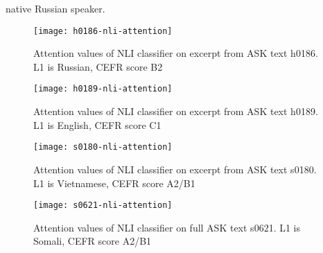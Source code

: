 native Russian speaker.  

\begin{figure}
  \centering
  \texttt{[image: h0186-nli-attention]}
  \caption{Attention values of NLI classifier on excerpt from ASK text h0186.
           L1 is Russian, CEFR score B2}
  \label{fig:h0186-nli-attention}
\end{figure}

\begin{figure}
  \centering
  \texttt{[image: h0189-nli-attention]}
  \caption{Attention values of NLI classifier on excerpt from ASK text h0189.
           L1 is English, CEFR score C1}
  \label{fig:h0189-nli-attention}
\end{figure}

\begin{figure}
  \centering
  \texttt{[image: s0180-nli-attention]}
  \caption{Attention values of NLI classifier on excerpt from ASK text s0180.
           L1 is Vietnamese, CEFR score A2/B1}
  \label{fig:s0180-nli-attention}
\end{figure}

\begin{figure}
  \centering
  \texttt{[image: s0621-nli-attention]}
  \caption{Attention values of NLI classifier on full ASK text s0621.
           L1 is Somali, CEFR score A2/B1}
  \label{fig:s0621-nli-attention}
\end{figure}
